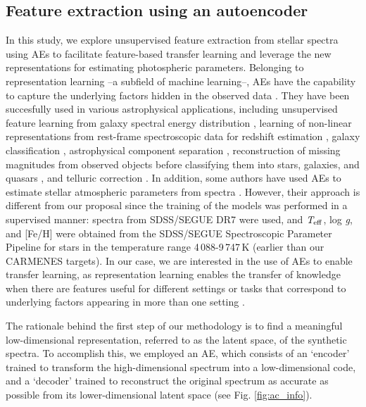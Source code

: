 \subsection{Feature extraction using an autoencoder} \label{acs_sec:ac}

In this study, we explore unsupervised feature extraction from stellar spectra using AEs to facilitate feature-based transfer learning and leverage the new representations for estimating photospheric parameters.
Belonging to representation learning --a subfield of machine learning--, AEs have the capability to capture the underlying factors hidden in the observed data \citep{Bengio13,Goodfellow16}.
They have been succesfully used in various astrophysical applications, including unsupervised feature learning from galaxy spectral energy distribution \citep{FronteraPons17}, learning of non-linear representations from rest-frame spectroscopic data for redshift estimation \citep{FronteraPons19}, galaxy classification \citep{Cheng21}, astrophysical component separation \citep{Milosevic21}, reconstruction of missing magnitudes from observed objects before classifying them into stars, galaxies, and quasars \citep{Khramtsov21}, and telluric correction \citep{Kjarsgaard23}.
In addition, some authors have used AEs to estimate stellar atmospheric parameters from spectra \citep{Yang2015,Li2017}. However, their approach is different from our proposal since the training of the models was performed in a supervised manner: spectra from SDSS/SEGUE DR7 \citep{Abazajian2009} were used, and $\textit{T}_{\rm eff}$, log \textit{g}, and [Fe/H] were obtained from the SDSS/SEGUE Spectroscopic Parameter Pipeline \citep[SSPP;][]{SSPP01,SSPP02,SSPP03,SSPP04} for stars in the temperature range 4\,088-9\,747\,K (earlier than our CARMENES targets).
In our case, we are interested in the use of AEs to enable transfer learning, as representation learning enables the transfer of knowledge when there are features useful for different settings or tasks that correspond to underlying factors appearing in more than one setting \citep{Goodfellow16}.

The rationale behind the first step of our methodology is to find a meaningful low-dimensional representation, referred to as the latent space, of the synthetic spectra. To accomplish this, we employed an AE, which consists of an `encoder' trained to transform the high-dimensional spectrum into a low-dimensional code, and a `decoder' trained to reconstruct the original spectrum as accurate as possible from its lower-dimensional latent space (see Fig. \ref{fig:ac_info}).

